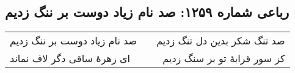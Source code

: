 \begin{center}
\section*{رباعی شماره ۱۲۵۹: صد نام زیاد دوست بر ننگ زدیم}
\label{sec:1259}
\begin{longtable}{l p{0.5cm} r}
صد نام زیاد دوست بر ننگ زدیم
&&
صد تنگ شکر بدین دل تنگ زدیم
\\
ای زهرهٔ ساقی دگر لاف نماند
&&
کز سور قرابهٔ تو بر سنگ زدیم
\\
\end{longtable}
\end{center}
